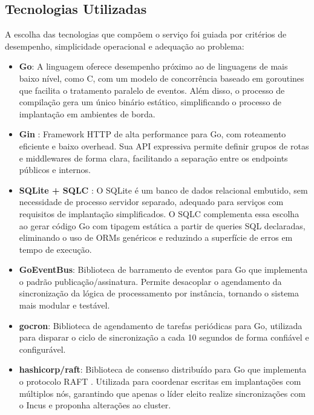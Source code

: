 \subsection{Tecnologias Utilizadas}
\label{subsec_tecnologias}

A escolha das tecnologias que compõem o serviço foi guiada por critérios de desempenho, simplicidade operacional e adequação ao problema:

\begin{itemize}
    \item \textbf{Go}: A linguagem oferece desempenho próximo ao de linguagens de mais baixo nível, como C, com um modelo de concorrência baseado em goroutines que facilita o tratamento paralelo de eventos. Além disso, o processo de compilação gera um único binário estático, simplificando o processo de implantação em ambientes de borda.

    \item \textbf{Gin} \citep{gin2024}: Framework HTTP de alta performance para Go, com roteamento eficiente e baixo overhead. Sua API expressiva permite definir grupos de rotas e middlewares de forma clara, facilitando a separação entre os endpoints públicos e internos.

    \item \textbf{SQLite + SQLC} \citep{sqlite2024}: O SQLite é um banco de dados relacional embutido, sem necessidade de processo servidor separado, adequado para serviços com requisitos de implantação simplificados. O SQLC complementa essa escolha ao gerar código Go com tipagem estática a partir de queries SQL declaradas, eliminando o uso de ORMs genéricos e reduzindo a superfície de erros em tempo de execução.

    \item \textbf{GoEventBus}: Biblioteca de barramento de eventos para Go que implementa o padrão publicação/assinatura. Permite desacoplar o agendamento da sincronização da lógica de processamento por instância, tornando o sistema mais modular e testável.

    \item \textbf{gocron}: Biblioteca de agendamento de tarefas periódicas para Go, utilizada para disparar o ciclo de sincronização a cada 10 segundos de forma confiável e configurável.

    \item \textbf{hashicorp/raft}: Biblioteca de consenso distribuído para Go que implementa o protocolo RAFT \citep{ongaro2014raft}. Utilizada para coordenar escritas em implantações com múltiplos nós, garantindo que apenas o líder eleito realize sincronizações com o Incus e proponha alterações ao cluster.


\end{itemize}
